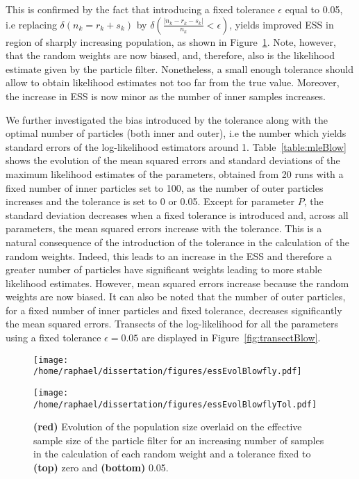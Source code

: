 \documentclass[12pt]{article}
\begin{document}
\clearpage
	This is confirmed by the fact that introducing a fixed tolerance $\epsilon$  equal to 0.05, i.e replacing $\delta(n_k = r_k+s_k)$ by $\delta(\frac{|n_k - r_k-s_k|}{n_k} < \epsilon)$, yields improved ESS in region of sharply increasing population, as shown in Figure~\ref{fig:essBlow}. Note, however, that the random weights are now biased, and, therefore, also is the likelihood estimate given by the particle filter. Nonetheless, a small enough tolerance should allow to obtain likelihood estimates not too far from the true value. Moreover, the increase in ESS is now minor as the number of inner samples increases.
	
	We further investigated the bias introduced by the tolerance along with the optimal number of particles (both inner and outer), i.e the number which yields standard errors of the log-likelihood estimators around 1. Table~\ref{table:mleBlow} shows the evolution of the mean squared errors and standard deviations of the maximum likelihood estimates of the parameters, obtained from 20 runs with a fixed number of inner particles set to 100, as the number of outer particles increases and the tolerance is set to 0 or 0.05. Except for parameter $P$, the standard deviation decreases when a fixed tolerance is introduced and, across all parameters, the mean squared errors increase with the tolerance. This is a natural consequence of the introduction of the tolerance in the calculation of the random weights. Indeed, this leads to an increase in the ESS and therefore a greater number of particles have significant weights leading to more stable likelihood estimates. However, mean squared errors increase because the random weights are now biased. It can also be noted that the number of outer particles, for a fixed number of inner particles and fixed tolerance, decreases significantly the mean squared errors.
	Transects of the log-likelihood for all the parameters using a fixed tolerance $\epsilon=0.05$ are displayed in Figure~\ref{fig:transectBlow}. 

	\begin{figure}[htb]
		\vspace{5mm}
		\centering
		\begin{minipage}{0.49\textwidth}
			\centering
			\texttt{[image: /home/raphael/dissertation/figures/essEvolBlowfly.pdf]}
		\end{minipage}
		\begin{minipage}{0.49\textwidth}
			\centering
			\texttt{[image: /home/raphael/dissertation/figures/essEvolBlowflyTol.pdf]}
		\end{minipage}
		\caption[Evolution of the ESS, Nicholson's blowfly model with the number of inner particles and the tolerance level]{\textbf{(red)} Evolution of the population size overlaid on the effective sample size of the particle filter for an increasing number of samples in the calculation of each random weight and a tolerance fixed to \textbf{(top)} zero and \textbf{(bottom)} 0.05.}
		\label{fig:essBlow}
	\end{figure}
\end{document}
